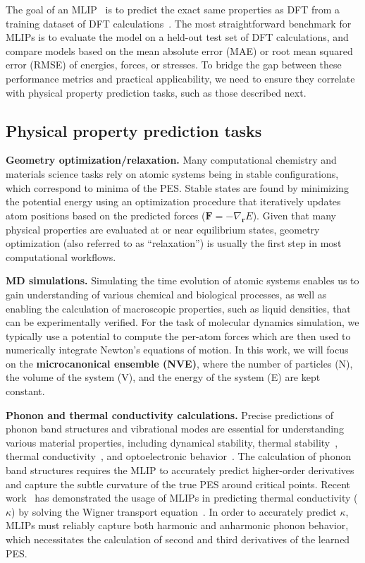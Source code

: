 \documentclass[twocolumn]{fairmeta}
\begin{document}
The goal of an MLIP~\citep{unke2021machine} is to predict the exact same properties as DFT from a training dataset of DFT calculations~\citep{oc20, riebesell2023matbench, loew2024universal}. The most straightforward benchmark for MLIPs is to evaluate the model on a held-out test set of DFT calculations, and compare models based on the mean absolute error (MAE) or root mean squared error (RMSE) of energies, forces, or stresses. To bridge the gap between these performance metrics and practical applicability, we need to ensure they correlate with physical property prediction tasks, such as those described next.

\subsection{Physical property prediction tasks}

\textbf{Geometry optimization/relaxation.} 
Many computational chemistry and materials science tasks rely on atomic systems being in stable configurations, which correspond to minima of the PES. Stable states are found by minimizing the potential energy using an optimization procedure that iteratively updates atom positions based on the predicted forces ($\bm F = -\nabla_{\bm r} E$). Given that many physical properties are evaluated at or near equilibrium states, geometry optimization (also referred to as ``relaxation'') is usually the first step in most computational workflows. 

\textbf{MD simulations.} 
Simulating the time evolution of atomic systems enables us to gain understanding of various chemical and biological processes, as well as enabling the calculation of macroscopic properties, such as liquid densities, that can be experimentally verified. For the task of molecular dynamics simulation, we typically use a potential to compute the per-atom forces which are then used to numerically integrate Newton’s equations of motion. In this work, we will focus on the \textbf{microcanonical ensemble (NVE)}, where the number of particles (N), the volume of the system (V), and the energy of the system (E) are kept constant. 

\textbf{Phonon and thermal conductivity calculations.}
Precise predictions of phonon band structures and vibrational modes are essential for understanding various material properties, including dynamical stability, thermal stability~\cite{bartel2022review, fultz2010vibrational}, thermal conductivity~\cite{razeghi2002thermal}, and optoelectronic behavior~\cite{ganose2021efficient}. The calculation of phonon band structures requires the MLIP to accurately predict higher-order derivatives and capture the subtle curvature of the true PES around critical points. Recent work~\cite{pota2024thermal} has demonstrated the usage of MLIPs in predicting thermal conductivity ($\kappa$) by solving the Wigner transport equation~\citep{simoncelli2022wigner}. In order to accurately predict $\kappa$, MLIPs must reliably capture both harmonic and anharmonic phonon behavior, which necessitates the calculation of second and third derivatives of the learned PES.
\end{document}
